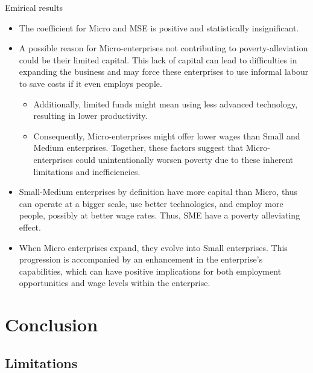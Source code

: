 \documentclass[10pt,aspectratio=169]{beamer}
\begin{document}
\begin{frame} {Emirical results}
    \begin{itemize}
\item The coefficient for Micro and MSE is positive and statistically insignificant. 

\item A possible reason for Micro-enterprises not contributing to poverty-alleviation could be their limited capital. This lack of capital can lead to difficulties in expanding the business and may force these enterprises to use informal labour to save costs if it even employs people. 

\begin{itemize}
    \item Additionally, limited funds might mean using less advanced technology, resulting in lower productivity. 
    \item Consequently, Micro-enterprises might offer lower wages than Small and Medium enterprises. Together, these factors suggest that Micro-enterprises could unintentionally worsen poverty due to these inherent limitations and inefficiencies. 
\end{itemize}
     \end{itemize}
\begin{itemize}
    \item Small-Medium enterprises by definition have more capital than Micro, thus can operate at a bigger scale, use better technologies, and employ more people, possibly at better wage rates. Thus, SME have a poverty alleviating effect.
    \item When Micro enterprises expand, they evolve into Small enterprises. This progression is accompanied by an enhancement in the enterprise's capabilities, which can have positive implications for both employment opportunities and wage levels within the enterprise.
\end{itemize}

\end{frame}

\section{Conclusion}

\subsection{Limitations}
\end{document}
